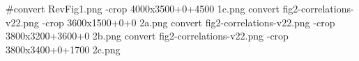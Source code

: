 #convert RevFig1.png -crop 4000x3500+0+4500 1c.png
convert fig2-correlations-v22.png -crop 3600x1500+0+0 2a.png
convert fig2-correlations-v22.png -crop 3800x3200+3600+0 2b.png
convert fig2-correlations-v22.png -crop 3800x3400+0+1700 2c.png
